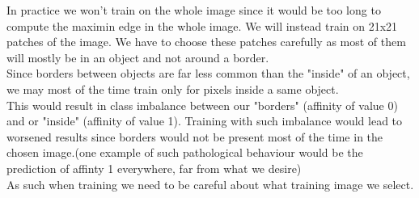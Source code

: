 In practice we won't train on the whole image since it would be too long to
compute the maximin edge in the whole image. We will instead train on 21x21
patches of the image. We have to choose these patches carefully as most of them
will mostly be in an object and not around a border.\\
Since borders between objects are far less common than the "inside" of an
object, we may most of the time train only for pixels inside a same object.\\
This would result in class imbalance between our "borders" (affinity of value
0) and or "inside" (affinity of value 1). Training with such imbalance would
lead to worsened results since borders would not be present most of the time in
the chosen image.(one example of such pathological behaviour would be the
prediction of affinty 1 everywhere, far from what we desire)\\

As such when training we need to be careful about what training image we
select.



